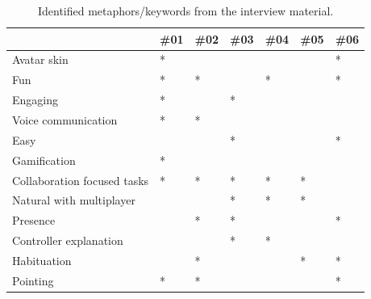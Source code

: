 \begin{table}[!ht]
\centering
\begin{tabular}{l|llllll}
                            & \#01 &\#02 &\#03 &\#04 & \#05 & \#06 \\ \hline 
Avatar skin                 & *        &          &          &          &          & *        \\ 
Fun                         & *        & *        &          & *        &          & *        \\ 
Engaging                    & *        &          & *        &          &          &          \\ 
Voice communication         & *        & *        &          &          &          &          \\ 
Easy                        &          &          & *        &          &          & *        \\ 
Gamification                & *        &          &          &          &          &          \\ 
Collaboration focused tasks & *        & *        & *        & *        & *        &          \\ 
Natural with multiplayer    &          &          & *        & *        & *        &          \\ 
Presence                    &          & *        & *        &          &          & *        \\ 
Controller explanation      &          &          & *        & *        &          &          \\ 
Habituation                 &          & *        &          &          & *        & *        \\ 
Pointing                    & *        & *        &          &          &          & *        \\ 
\end{tabular}

\caption{Identified metaphors/keywords from the interview material.}
\label{table:methaphorsInterview1}
\end{table}


